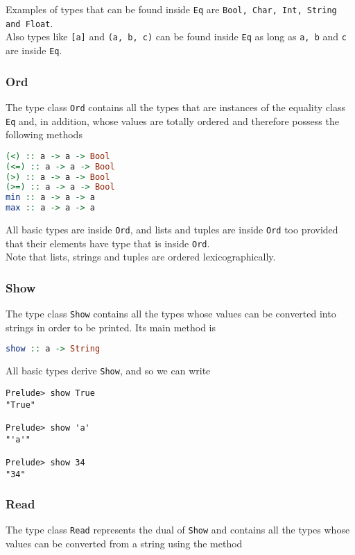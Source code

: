Examples of types that can be found inside \texttt{Eq} are \texttt{Bool, Char, Int, String and Float}. \\

Also types like \texttt{[a]} and \texttt{(a, b, c)} can be found inside \texttt{Eq} as long as \texttt{a, b} and \texttt{c} are inside \texttt{Eq}. 


\subsubsection{Ord}
The type class \texttt{Ord} contains all the types that are instances of the equality class \texttt{Eq} and, in addition, whose values are totally ordered and therefore possess the following methods

\begin{lstlisting}[language=haskell]
(<) :: a -> a -> Bool
(<=) :: a -> a -> Bool
(>) :: a -> a -> Bool
(>=) :: a -> a -> Bool
min :: a -> a -> a
max :: a -> a -> a
\end{lstlisting}

All basic types are inside \texttt{Ord}, and lists and tuples are inside \texttt{Ord} too provided that their elements have type that is inside \texttt{Ord}. \\
Note that lists, strings and tuples are ordered lexicographically. 


\subsubsection{Show}
The type class \texttt{Show} contains all the types whose values can be converted into strings in order to be printed. Its main method is 

\begin{lstlisting}[language=haskell]
show :: a -> String
\end{lstlisting}

All basic types derive \texttt{Show}, and so we can write

\begin{lstlisting}
Prelude> show True
"True"

Prelude> show 'a'
"'a'"

Prelude> show 34
"34"
\end{lstlisting}


\subsubsection{Read}
The type class \texttt{Read} represents the dual of \texttt{Show} and contains all the types whose values can be converted from a string using the method


